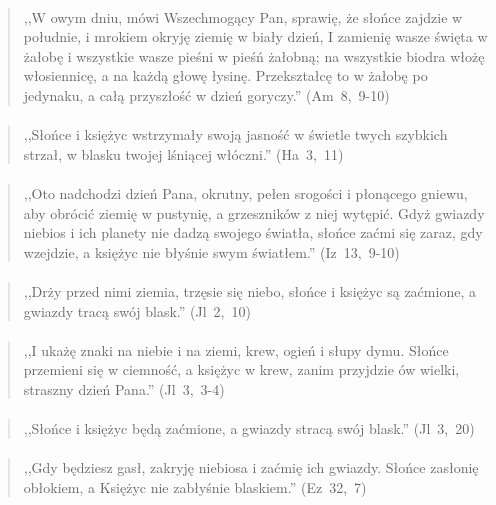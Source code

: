 \documentclass[10pt,a4paper,oneside]{article}
\begin{document}
\paragraph{}
\begin{quote}
,,W owym dniu, mówi Wszechmogący Pan, sprawię, że słońce zajdzie w południe, i mrokiem okryję ziemię w biały dzień, I zamienię wasze święta w żałobę i wszystkie wasze pieśni w pieśń żałobną; na wszystkie biodra włożę włosiennicę, a na każdą głowę łysinę. Przekształcę to w żałobę po jedynaku, a całą przyszłość w dzień goryczy.'' \mbox{(Am 8, 9-10)}
\end{quote}
\paragraph{}
\begin{quote}
,,Słońce i księżyc wstrzymały swoją jasność w świetle twych szybkich strzał, w blasku twojej lśniącej włóczni.'' \mbox{(Ha 3, 11)}
\end{quote}
\paragraph{}
\begin{quote}
,,Oto nadchodzi dzień Pana, okrutny, pełen srogości i płonącego gniewu, aby obrócić ziemię w pustynię, a grzeszników z niej wytępić. Gdyż gwiazdy niebios i ich planety nie dadzą swojego światła, słońce zaćmi się zaraz, gdy wzejdzie, a księżyc nie błyśnie swym światłem.'' \mbox{(Iz 13, 9-10)}
\end{quote}
\paragraph{}
\begin{quote}
,,Drży przed nimi ziemia, trzęsie się niebo, słońce i księżyc są zaćmione, a gwiazdy tracą swój blask.'' \mbox{(Jl 2, 10)}
\end{quote}
\paragraph{}
\begin{quote}
,,I ukażę znaki na niebie i na ziemi, krew, ogień i słupy dymu. Słońce przemieni się w ciemność, a księżyc w krew, zanim przyjdzie ów wielki, straszny dzień Pana.'' \mbox{(Jl 3, 3-4)}
\end{quote}
\paragraph{}
\begin{quote}
,,Słońce i księżyc będą zaćmione, a gwiazdy stracą swój blask.'' \mbox{(Jl 3, 20)}
\end{quote}
\paragraph{}
\begin{quote}
,,Gdy będziesz gasł, zakryję niebiosa i zaćmię ich gwiazdy. Słońce zasłonię obłokiem, a Księżyc nie zabłyśnie blaskiem.'' \mbox{(Ez 32, 7)}
\end{quote}
\end{document}

